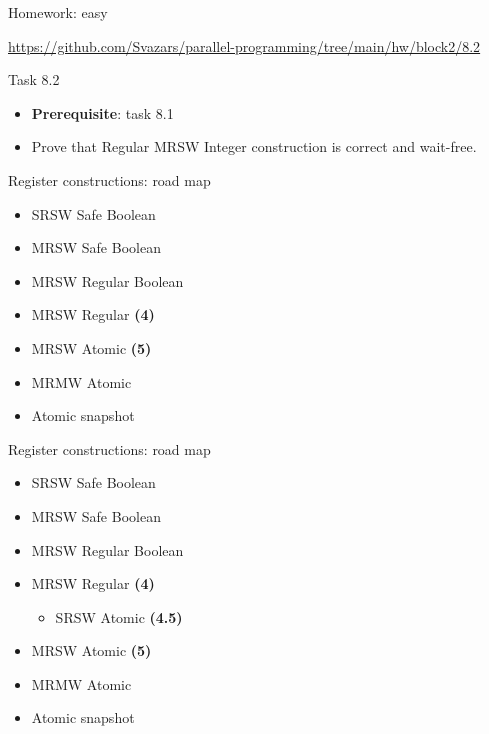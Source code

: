 \begin{frame}[t]{Homework: easy}

{\small\url{https://github.com/Svazars/parallel-programming/tree/main/hw/block2/8.2}}
\begin{homeworkmail}{Task 8.2}
    \begin{itemize}
      \item \textbf{Prerequisite}: task 8.1
      \item Prove that Regular MRSW Integer construction is correct and wait-free.  
    \end{itemize}
\end{homeworkmail}

\end{frame}


\begin{frame}{Register constructions: road map}

\begin{itemize}
  \item SRSW Safe Boolean 
  \item MRSW Safe Boolean 
  \item MRSW Regular Boolean 
  \item MRSW Regular \textbf{(4)}
  \item MRSW Atomic \textbf{(5)}
  \item MRMW Atomic
  \item Atomic snapshot
\end{itemize}

\end{frame}


\begin{frame}[noframenumbering]{Register constructions: road map}

\begin{itemize}
  \item SRSW Safe Boolean 
  \item MRSW Safe Boolean 
  \item MRSW Regular Boolean 
  \item MRSW Regular \textbf{(4)}
  \begin{itemize}
    \item SRSW Atomic \textbf{(4.5)}     
  \end{itemize}
  \item MRSW Atomic \textbf{(5)} 
  \item MRMW Atomic
  \item Atomic snapshot
\end{itemize}

\end{frame}


